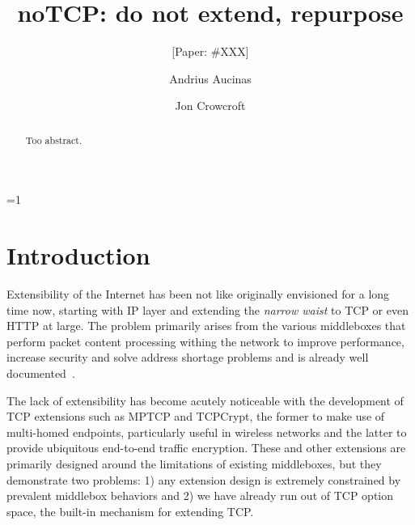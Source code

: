 \documentclass{sig-alternate-10pt}
\def\anon{1}        %
\begin{document}
\date{}


\title{noTCP: do not extend, repurpose}
\ifnum\anon=1
\author{[Paper: \#XXX]}%
\else
{}
\author{
\alignauthor Andrius Aucinas\\
\and
\alignauthor Jon Crowcroft\\
}
\fi

    
\maketitle
\begin{abstract}
Too abstract.
\end{abstract} 

\section{Introduction}
\label{section:intro}

Extensibility of the Internet has been not like originally envisioned for a long time now, starting with IP layer and extending the \emph{narrow waist} to TCP or even HTTP at large. The problem primarily arises from the various middleboxes that perform packet content processing withing the network to improve performance\cite{Kopparty:2002ht,Chakravorty:2003dm}, increase security\cite{Handley:2001vp,Vutukuru:2008fc} and solve address shortage problems and is already well documented~\cite{UntoldMiddlebox2011,Qian:2012bj,Honda:2011ci,Guha:2005tb}.

The lack of extensibility has become acutely noticeable with the development of TCP extensions such as MPTCP and TCPCrypt, the former to make use of multi-homed endpoints, particularly useful in wireless networks and the latter to provide ubiquitous end-to-end traffic encryption. These and other extensions are primarily designed around the limitations of existing middleboxes, but they demonstrate two problems: 1) any extension design is extremely constrained by prevalent middlebox behaviors\cite{Honda:2011ci} and 2) we have already run out of TCP option space, the built-in mechanism for extending TCP.
\end{document}
